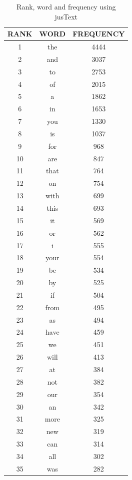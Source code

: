 \documentclass[12pt]{Report}
\begin{document}
\newpage
\begin{table}
\caption{Rank, word and frequency using jusText }
\begin{center}
  \begin{tabular}{ c | c | c }
    \hline
    RANK & WORD & FREQUENCY \\ \hline
1 & the  &  4444 \\ \hline
2 & and & 3037 \\ \hline
3 & to & 2753 \\ \hline
4 & of & 2015 \\ \hline
5 & a  & 1862 \\ \hline
6 & in & 1653 \\ \hline
7 & you & 1330 \\ \hline
8 & is & 1037 \\ \hline
9 & for  & 968 \\ \hline
10 & are  & 847 \\ \hline
11 & that & 764 \\ \hline
12 & on &  754 \\ \hline
13 & with  &  699 \\ \hline
14 & this & 693 \\ \hline
15 & it & 569 \\ \hline
16 & or & 562 \\ \hline
17 & i & 555 \\ \hline
18 & your  & 554 \\ \hline
19 & be  & 534 \\ \hline
20 & by & 525 \\ \hline
21 & if &   504 \\ \hline
22 & from & 495 \\ \hline
23 & as   & 494 \\ \hline
24 & have & 459 \\ \hline
25 & we & 451 \\ \hline
26 & will & 413 \\ \hline
27 & at & 384 \\ \hline
28 & not & 382 \\ \hline
29 & our &  354 \\ \hline
30 & an  & 342 \\ \hline
31 & more & 325 \\ \hline
32 & new & 319 \\ \hline
33 & can &  314 \\ \hline
34 & all & 302 \\ \hline
35 & was & 282 \\ \hline

\end{tabular}
\end{center}
\end{table}
\end{document}
